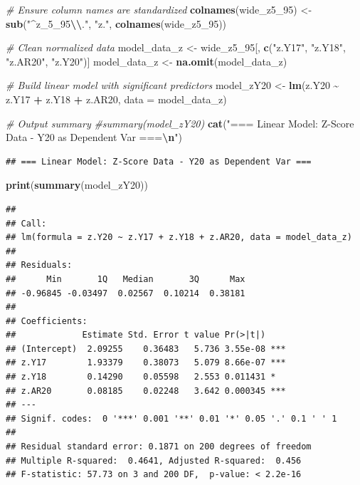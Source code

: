 \documentclass[
]{article}
\newenvironment{Shaded}{\begin{snugshade}}{\end{snugshade}}
\newcommand{\AttributeTok}[1]{\textcolor[rgb]{0.13,0.29,0.53}{#1}}
\newcommand{\CommentTok}[1]{\textcolor[rgb]{0.56,0.35,0.01}{\textit{#1}}}
\newcommand{\FunctionTok}[1]{\textcolor[rgb]{0.13,0.29,0.53}{\textbf{#1}}}
\newcommand{\NormalTok}[1]{#1}
\newcommand{\OtherTok}[1]{\textcolor[rgb]{0.56,0.35,0.01}{#1}}
\newcommand{\SpecialCharTok}[1]{\textcolor[rgb]{0.81,0.36,0.00}{\textbf{#1}}}
\newcommand{\StringTok}[1]{\textcolor[rgb]{0.31,0.60,0.02}{#1}}
\begin{document}
\begin{Shaded}
\begin{Highlighting}[]
\CommentTok{\# Ensure column names are standardized}
\FunctionTok{colnames}\NormalTok{(wide\_z5\_95) }\OtherTok{\textless{}{-}} \FunctionTok{sub}\NormalTok{(}\StringTok{"\^{}z\_5\_95}\SpecialCharTok{\textbackslash{}\textbackslash{}}\StringTok{."}\NormalTok{, }\StringTok{"z."}\NormalTok{, }\FunctionTok{colnames}\NormalTok{(wide\_z5\_95))}

\CommentTok{\# Clean normalized data}
\NormalTok{model\_data\_z }\OtherTok{\textless{}{-}}\NormalTok{ wide\_z5\_95[, }\FunctionTok{c}\NormalTok{(}\StringTok{"z.Y17"}\NormalTok{, }\StringTok{"z.Y18"}\NormalTok{, }\StringTok{"z.AR20"}\NormalTok{, }\StringTok{"z.Y20"}\NormalTok{)]}
\NormalTok{model\_data\_z }\OtherTok{\textless{}{-}} \FunctionTok{na.omit}\NormalTok{(model\_data\_z)}

\CommentTok{\# Build linear model with significant predictors}
\NormalTok{model\_zY20 }\OtherTok{\textless{}{-}} \FunctionTok{lm}\NormalTok{(z.Y20 }\SpecialCharTok{\textasciitilde{}}\NormalTok{ z.Y17 }\SpecialCharTok{+}\NormalTok{ z.Y18 }\SpecialCharTok{+}\NormalTok{ z.AR20, }\AttributeTok{data =}\NormalTok{ model\_data\_z)}

\CommentTok{\# Output summary}
\CommentTok{\#summary(model\_zY20)}
\FunctionTok{cat}\NormalTok{(}\StringTok{"=== Linear Model: Z{-}Score Data {-} Y20 as Dependent Var ===}\SpecialCharTok{\textbackslash{}n}\StringTok{"}\NormalTok{)}
\end{Highlighting}
\end{Shaded}

\begin{verbatim}
## === Linear Model: Z-Score Data - Y20 as Dependent Var ===
\end{verbatim}

\begin{Shaded}
\begin{Highlighting}[]
\FunctionTok{print}\NormalTok{(}\FunctionTok{summary}\NormalTok{(model\_zY20))}
\end{Highlighting}
\end{Shaded}

\begin{verbatim}
## 
## Call:
## lm(formula = z.Y20 ~ z.Y17 + z.Y18 + z.AR20, data = model_data_z)
## 
## Residuals:
##      Min       1Q   Median       3Q      Max 
## -0.96845 -0.03497  0.02567  0.10214  0.38181 
## 
## Coefficients:
##             Estimate Std. Error t value Pr(>|t|)    
## (Intercept)  2.09255    0.36483   5.736 3.55e-08 ***
## z.Y17        1.93379    0.38073   5.079 8.66e-07 ***
## z.Y18        0.14290    0.05598   2.553 0.011431 *  
## z.AR20       0.08185    0.02248   3.642 0.000345 ***
## ---
## Signif. codes:  0 '***' 0.001 '**' 0.01 '*' 0.05 '.' 0.1 ' ' 1
## 
## Residual standard error: 0.1871 on 200 degrees of freedom
## Multiple R-squared:  0.4641, Adjusted R-squared:  0.456 
## F-statistic: 57.73 on 3 and 200 DF,  p-value: < 2.2e-16
\end{verbatim}
\end{document}
